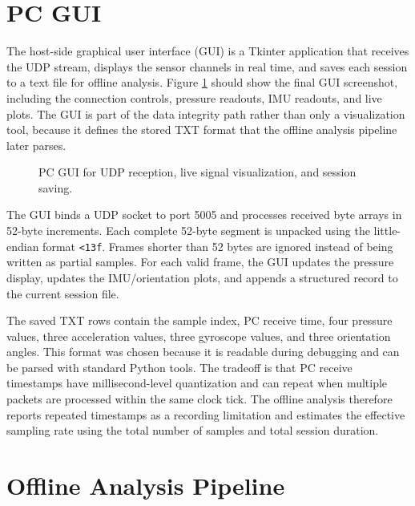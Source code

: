 \section{PC GUI}
\label{sec:pc_gui}

The host-side graphical user interface (GUI) is a Tkinter application that receives the UDP stream, displays the sensor channels in real time, and saves each session to a text file for offline analysis. Figure \ref{fig:pc_gui} should show the final GUI screenshot, including the connection controls, pressure readouts, IMU readouts, and live plots. The GUI is part of the data integrity path rather than only a visualization tool, because it defines the stored TXT format that the offline analysis pipeline later parses.

\begin{figure}[t]
\centering
\caption{PC GUI for UDP reception, live signal visualization, and session saving.}
\label{fig:pc_gui}
\end{figure}

The GUI binds a UDP socket to port 5005 and processes received byte arrays in 52-byte increments. Each complete 52-byte segment is unpacked using the little-endian format \texttt{<13f}. Frames shorter than 52 bytes are ignored instead of being written as partial samples. For each valid frame, the GUI updates the pressure display, updates the IMU/orientation plots, and appends a structured record to the current session file.

The saved TXT rows contain the sample index, PC receive time, four pressure values, three acceleration values, three gyroscope values, and three orientation angles. This format was chosen because it is readable during debugging and can be parsed with standard Python tools. The tradeoff is that PC receive timestamps have millisecond-level quantization and can repeat when multiple packets are processed within the same clock tick. The offline analysis therefore reports repeated timestamps as a recording limitation and estimates the effective sampling rate using the total number of samples and total session duration.

\section{Offline Analysis Pipeline}
\label{sec:offline_pipeline}

